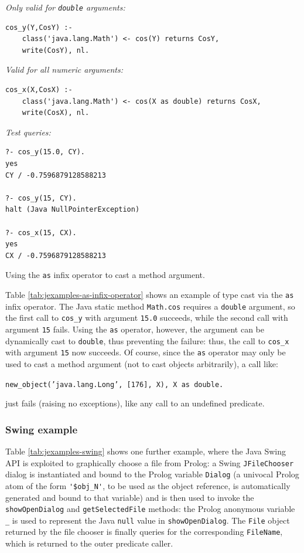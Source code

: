 \begin{table}
\textit{Only valid for \texttt{double} arguments:}
\begin{verbatim}
cos_y(Y,CosY) :-
    class('java.lang.Math') <- cos(Y) returns CosY,
    write(CosY), nl.
\end{verbatim}

\textit{Valid for all numeric arguments:}
\begin{verbatim}
cos_x(X,CosX) :-
    class('java.lang.Math') <- cos(X as double) returns CosX,
    write(CosX), nl.
\end{verbatim}

\textit{Test queries:}
\begin{verbatim}
?- cos_y(15.0, CY).
yes
CY / -0.7596879128588213

?- cos_y(15, CY).
halt (Java NullPointerException)

?- cos_x(15, CX).
yes
CX / -0.7596879128588213
\end{verbatim}
\caption{Using the \texttt{as} infix operator to cast a method argument.}
\label{tab:jexamples-as-infix-operator}
\end{table}	

Table \ref{tab:jexamples-as-infix-operator} shows an example of type cast via the \texttt{as} infix operator.
The Java static method \texttt{Math.cos} requires a \texttt{double} argument, so the first call to \texttt{cos\_y} with argument \texttt{15.0} succeeds, while the second call with argument \texttt{15} fails. Using the \texttt{as} operator, however, the argument can be dynamically cast to \texttt{double}, thus preventing the failure: thus, the call to \texttt{cos\_x} with argument \texttt{15} now succeeds.
%
Of course, since the \texttt{as} operator may only be used to cast a method argument (not to cast objects arbitrarily), a call like:

\texttt{new\_object('java.lang.Long', [176], X), X as double.}

\noindent just fails (raising no exceptions), like any call to an undefined predicate.

\subsubsection{Swing example}

Table \ref{tab:jexamples-swing} shows one further example, where the Java Swing API is
exploited to graphically choose a file from Prolog: a Swing \texttt{JFileChooser} dialog is instantiated and bound to the Prolog variable \texttt{Dialog} (a univocal Prolog atom of the form \verb|'$obj_N'|, to be used as the object reference, is automatically generated and bound to that variable) and is then used to invoke the \texttt{showOpenDialog} and
\texttt{getSelectedFile} methods: the Prolog anonymous variable \texttt{\_} is used to represent the Java \texttt{null} value in \texttt{showOpenDialog}.
%
The \texttt{File} object returned by the file chooser is finally queries for the corresponding \texttt{FileName}, which is returned to the outer predicate caller.

